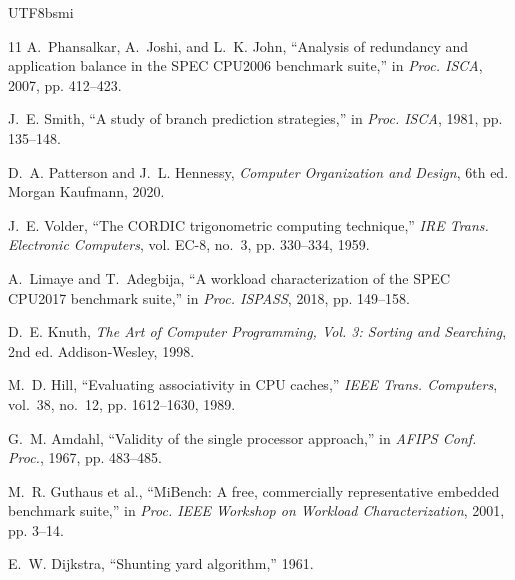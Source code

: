 \documentclass[journal,twoside]{IEEEtran}
\begin{document}
\begin{CJK}{UTF8}{bsmi}
\begin{thebibliography}{11}
 A.~Phansalkar, A.~Joshi, and L.~K. John, ``Analysis of redundancy and application balance in the SPEC CPU2006 benchmark suite,'' in \emph{Proc. ISCA}, 2007, pp. 412--423.

 J.~E. Smith, ``A study of branch prediction strategies,'' in \emph{Proc. ISCA}, 1981, pp. 135--148.

 D.~A. Patterson and J.~L. Hennessy, \emph{Computer Organization and Design}, 6th ed. Morgan Kaufmann, 2020.

 J.~E. Volder, ``The CORDIC trigonometric computing technique,'' \emph{IRE Trans. Electronic Computers}, vol. EC-8, no.~3, pp. 330--334, 1959.

 A.~Limaye and T.~Adegbija, ``A workload characterization of the SPEC CPU2017 benchmark suite,'' in \emph{Proc. ISPASS}, 2018, pp. 149--158.

 D.~E. Knuth, \emph{The Art of Computer Programming, Vol. 3: Sorting and Searching}, 2nd ed. Addison-Wesley, 1998.

 M.~D. Hill, ``Evaluating associativity in CPU caches,'' \emph{IEEE Trans. Computers}, vol.~38, no.~12, pp. 1612--1630, 1989.

 G.~M. Amdahl, ``Validity of the single processor approach,'' in \emph{AFIPS Conf. Proc.}, 1967, pp. 483--485.

 M.~R. Guthaus et al., ``MiBench: A free, commercially representative embedded benchmark suite,'' in \emph{Proc. IEEE Workshop on Workload Characterization}, 2001, pp. 3--14.

 E.~W. Dijkstra, ``Shunting yard algorithm,'' 1961.
\end{thebibliography}

\end{CJK}
\end{document}
